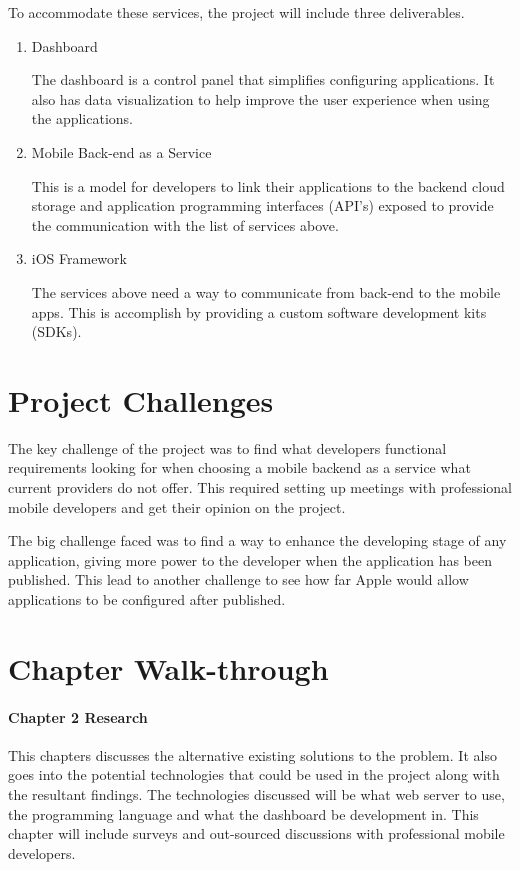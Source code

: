 To accommodate these services, the project will include three deliverables.

\begin{enumerate}
  \item Dashboard
  
    The dashboard is a control panel that simplifies configuring applications. It also has data visualization to help improve the user experience when using the applications.
  \item Mobile Back-end as a Service
  
    This is a model for developers to link their applications to the backend cloud storage and application programming interfaces (API's) exposed to provide the communication with the list of services above.
  \item iOS Framework
  
    The services above need a way to communicate from back-end to the mobile apps. This is accomplish by providing a custom software development kits (SDKs).
\end{enumerate}

\section{Project Challenges}

The key challenge of the project was to find what developers functional requirements looking for when choosing a mobile backend as a service what current providers do not offer. This required setting up meetings with professional mobile developers and get their opinion on the project.

The big challenge faced was to find a way to enhance the developing stage of any application, giving more power to the developer when the application has been published. This lead to another challenge to see how far Apple would allow applications to be configured after published.

\section{Chapter Walk-through}

\paragraph{Chapter 2 Research}

This chapters discusses the alternative existing solutions to the problem. It also goes into the potential technologies that could be used in the project along with the resultant findings. The technologies discussed will be what web server to use, the programming language and what the dashboard be development in. This chapter will include surveys and out-sourced discussions with professional mobile developers.


